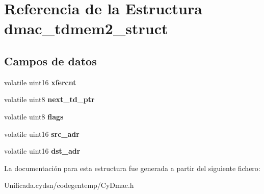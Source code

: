 \hypertarget{structdmac__tdmem2__struct}{}\section{Referencia de la Estructura dmac\+\_\+tdmem2\+\_\+struct}
\label{structdmac__tdmem2__struct}
\subsection*{Campos de datos}
\begin{DoxyCompactItemize}
\item 
\mbox{\label{structdmac__tdmem2__struct_a8fdfddec610975b7b466bf7affc447cf}} 
volatile uint16 {\bfseries xfercnt}
\item 
\mbox{\label{structdmac__tdmem2__struct_a1f6ee045cfd477c2fa6a6485c79bac26}} 
volatile uint8 {\bfseries next\+\_\+td\+\_\+ptr}
\item 
\mbox{\label{structdmac__tdmem2__struct_af98bf4e08f585be9c850a2ea928d1713}} 
volatile uint8 {\bfseries flags}
\item 
\mbox{\label{structdmac__tdmem2__struct_a1b4fbc68452394bf50a3a559b531c4df}} 
volatile uint16 {\bfseries src\+\_\+adr}
\item 
\mbox{\label{structdmac__tdmem2__struct_a7e5c77d98a26aba7736fda7e4236a97b}} 
volatile uint16 {\bfseries dst\+\_\+adr}
\end{DoxyCompactItemize}


La documentación para esta estructura fue generada a partir del siguiente fichero\+:\begin{DoxyCompactItemize}
\item 
Unificada.\+cydsn/codegentemp/Cy\+Dmac.\+h\end{DoxyCompactItemize}
